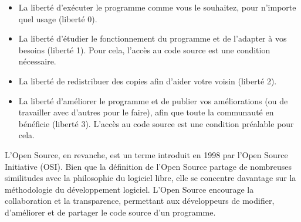 \begin{itemize}
\item La liberté d'exécuter le programme comme vous le souhaitez, pour n'importe quel usage (liberté 0).
\item La liberté d'étudier le fonctionnement du programme et de l'adapter à vos besoins (liberté 1). Pour cela, l'accès au code source est une condition nécessaire.
\item La liberté de redistribuer des copies afin d'aider votre voisin (liberté 2).
\item La liberté d'améliorer le programme et de publier vos améliorations (ou de travailler avec d'autres pour le faire), afin que toute la communauté en bénéficie (liberté 3). L'accès au code source est une condition préalable pour cela.
\end{itemize}

L'Open Source, en revanche, est un terme introduit en 1998 par l'Open Source Initiative (OSI)\cite{FSF,OSI}. Bien que la définition de l'Open Source partage de nombreuses similitudes avec la philosophie du logiciel libre, elle se concentre davantage sur la méthodologie du développement logiciel. L'Open Source encourage la collaboration et la transparence, permettant aux développeurs de modifier, d'améliorer et de partager le code source d'un programme.

